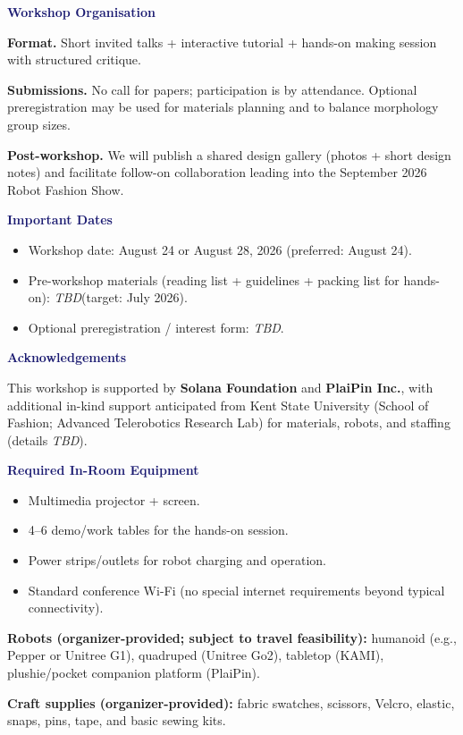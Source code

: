 \documentclass[12pt,letterpaper]{article}
\newcommand{\FormSection}[1]{\par\vspace{0.75\baselineskip}\noindent{\color{MidnightBlue}\rule{\textwidth}{0.4pt}}\par\vspace{2pt}\noindent\textbf{\textcolor{MidnightBlue}{#1}}\par}
\newcommand{\TBD}{\textit{TBD}}
\begin{document}
\FormSection{Workshop Organisation}
\textbf{Format.} Short invited talks + interactive tutorial + hands-on making session with structured critique.

\textbf{Submissions.} No call for papers; participation is by attendance. Optional preregistration may be used for materials planning and to balance morphology group sizes.

\textbf{Post-workshop.} We will publish a shared design gallery (photos + short design notes) and facilitate follow-on collaboration leading into the September 2026 Robot Fashion Show.

\FormSection{Important Dates}
\begin{itemize}
  \item Workshop date: August 24 or August 28, 2026 (preferred: August 24).
  \item Pre-workshop materials (reading list + guidelines + packing list for hands-on): \TBD (target: July 2026).
  \item Optional preregistration / interest form: \TBD.
\end{itemize}

\FormSection{Acknowledgements}
This workshop is supported by \textbf{Solana Foundation} and \textbf{PlaiPin Inc.}, with additional in-kind support anticipated from Kent State University (School of Fashion; Advanced Telerobotics Research Lab) for materials, robots, and staffing (details \TBD).

\FormSection{Required In-Room Equipment}
\begin{itemize}
  \item Multimedia projector + screen.
  \item 4--6 demo/work tables for the hands-on session.
  \item Power strips/outlets for robot charging and operation.
  \item Standard conference Wi-Fi (no special internet requirements beyond typical connectivity).
\end{itemize}

\textbf{Robots (organizer-provided; subject to travel feasibility):} humanoid (e.g., Pepper or Unitree G1), quadruped (Unitree Go2), tabletop (KAMI), plushie/pocket companion platform (PlaiPin).

\textbf{Craft supplies (organizer-provided):} fabric swatches, scissors, Velcro, elastic, snaps, pins, tape, and basic sewing kits.
\end{document}
